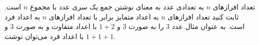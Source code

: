     \p 
تعداد افرازهای
$n$
به تعدادی عدد به معنای نوشتن جمع یک سری عدد با مجموع
$n$
است. ثابت کنید تعداد افرازهای
$n$
به اعداد متمایز برابر با تعداد افرازهای
$n$
به اعداد فرد است. به عنوان مثال عدد
$3$
را به صورت
$3$
و
$1 + 2$
با اعداد متفاوت و به صورت
$3$
و
$1 + 1 + 1$
با اعداد فرد می‌توان نوشت.